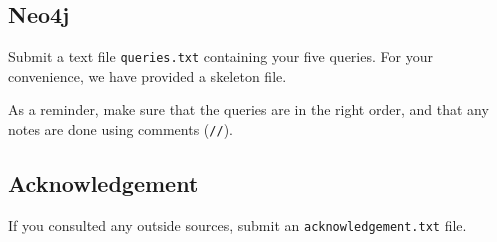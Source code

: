 \documentclass[10pt]{article}
\begin{document}
\subsection{Neo4j}

Submit a text file \texttt{queries.txt} containing your five queries. For your convenience, we have provided a skeleton file.

As a reminder, make sure that the queries are in the right order, and that any notes are done using comments (\texttt{//}).

\subsection{Acknowledgement}

If you consulted any outside sources, submit an \texttt{acknowledgement.txt} file.
\end{document}
